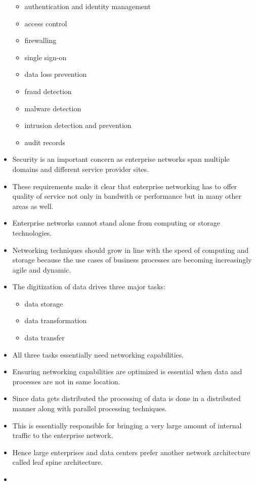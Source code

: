 \documentclass[a4paper, 12pt]{article}
\begin{document}
\begin{itemize}
\begin{itemize}
\item
authentication and identity management
\item
access control
\item
firewalling
\item
single sign-on
\item
data loss prevention
\item
fraud detection
\item
malware detection
\item
intrusion detection and prevention
\item
audit records
\end{itemize}
\item
Security is an important concern as enterprise networks span multiple domains and different service provider sites.
\item
These requirements make it clear that enterprise networking has to offer quality of service not only in bandwith or performance but in many other areas as well.
\item
Enterprise networks cannot stand alone from computing or storage technologies.
\item
Networking techniques should grow in line with the speed of computing and storage because the use cases of business processes are becoming increasingly agile and dynamic.
\item
The digitization of data drives three major tasks:
\begin{itemize}
\item
data storage
\item
data transformation
\item
data transfer
\end{itemize}
\item
All three tasks essentially need networking capabilities.
\item
Ensuring networking capabilities are optimized is essential when data and processes are not in same location.
\item
Since data gets distributed the processing of data is done in a distributed manner along with parallel processing techniques.
\item
This is essentially responsible for bringing a very large amount of internal traffic to the enterprise network.
\item
Hence large enterprises and data centers prefer another network architecture called leaf spine architecture.
\item

\end{itemize}
\end{document}
